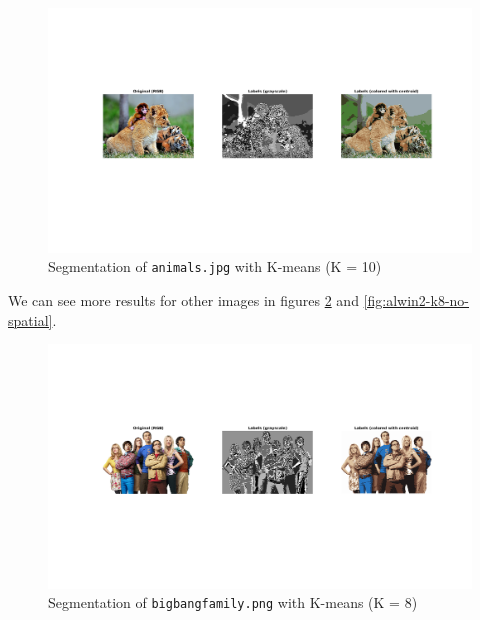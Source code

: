 \begin{figure}[hbt]
\centering
\includegraphics[trim={50px 250px 50px 220px},clip,width=\textwidth]{img/kmeans/animals_k10_no_spatial.png}
\caption{Segmentation of \texttt{animals.jpg} with K-means (K = 10)}
\label{fig:animals-k10-no-spatial}
\end{figure}

We can see more results for other images in figures \ref{fig:bigbangfamily-k8-no-spatial}
and \ref{fig:alwin2-k8-no-spatial}.

\begin{figure}[hbt]
\centering
\includegraphics[trim={50px 250px 50px 220px},clip,width=\textwidth]{img/kmeans/bigbangfamily_k8_no_spatial.png}
\caption{Segmentation of \texttt{bigbangfamily.png} with K-means (K = 8)}
\label{fig:bigbangfamily-k8-no-spatial}
\end{figure}

